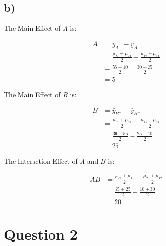 \documentclass{article}
\begin{document}
\subsection*{b)}
\begin{flushleft}
The Main Effect of $A$ is:
\end{flushleft}
\begin{align*}
    A & = \bar{y}_{A^{+}} - \bar{y}_{A^{-}} \\
      & = \frac{\mu_{22} + \mu_{21}}{2} - \frac{\mu_{12} + \mu_{11}}{2} \\
      & = \frac{55 + 10}{2} - \frac{30 + 25}{2} \\
      & = 5
\end{align*}
\begin{flushleft}
The Main Effect of $B$ is:
\end{flushleft}
\begin{align*}
    B & = \bar{y}_{B^{+}} - \bar{y}_{B^{-}} \\
      & = \frac{\mu_{12} + \mu_{22}}{2} - \frac{\mu_{11} + \mu_{21}}{2} \\
      & = \frac{30 + 55}{2} - \frac{25 + 10}{2} \\
      & = 25
\end{align*}
\begin{flushleft}
The Interaction Effect of $A$ and $B$ is:
\end{flushleft}
\begin{align*}
    AB & = \frac{\mu_{22} + \mu_{11}}{2} - \frac{\mu_{21} + \mu_{12}}{2} \\
       & = \frac{55 + 25}{2} - \frac{10 + 30}{2} \\
       & = 20
\end{align*}

\section*{Question 2}
\end{document}
